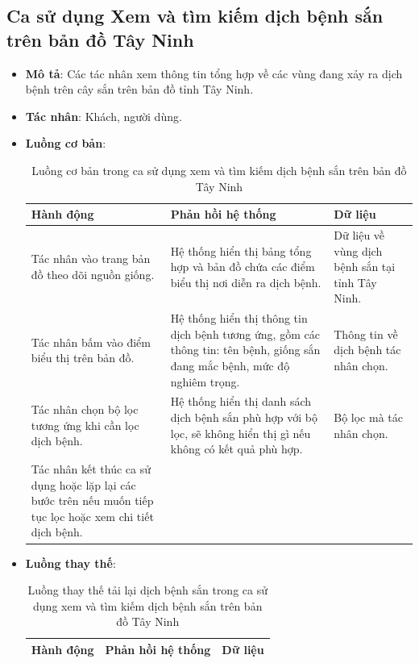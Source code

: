 \documentclass[./../main.tex]{subfiles}
\begin{document}
\subsection{Ca sử dụng Xem và tìm kiếm dịch bệnh sắn trên bản đồ Tây Ninh}
\begin{itemize}
    \item \textbf{Mô tả}: Các tác nhân xem thông tin tổng hợp về các vùng đang xảy ra dịch bệnh trên cây sắn trên bản đồ tỉnh Tây Ninh.
    \item \textbf{Tác nhân}: Khách, người dùng.
    \item \textbf{Luồng cơ bản}:
    \begin{table}[H]
    \caption{\label{uc-25}Luồng cơ bản trong ca sử dụng xem và tìm kiếm dịch bệnh sắn trên bản đồ Tây Ninh}
    \begin{tabularx}{\textwidth}{| X | X | X |}
        \hline
        \textbf{Hành động} & \textbf{Phản hồi hệ thống} & \textbf{Dữ liệu} \\ \hline
        Tác nhân vào trang bản đồ theo dõi nguồn giống. & Hệ thống hiển thị bảng tổng hợp và bản đồ chứa các điểm biểu thị nơi diễn ra dịch bệnh. & Dữ liệu về vùng dịch bệnh sắn tại tỉnh Tây Ninh.
        \\ \hline
        Tác nhân bấm vào điểm biểu thị trên bản đồ. & Hệ thống hiển thị thông tin dịch bệnh tương ứng, gồm các thông tin: tên bệnh, giống sắn đang mắc bệnh, mức độ nghiêm trọng. & Thông tin về dịch bệnh tác nhân chọn.
        \\ \hline
        Tác nhân chọn bộ lọc tương ứng khi cần lọc dịch bệnh. & Hệ thống hiển thị danh sách dịch bệnh sắn phù hợp với bộ lọc, sẽ không hiển thị gì nếu không có kết quả phù hợp. & Bộ lọc mà tác nhân chọn.
        \\ \hline
        Tác nhân kết thúc ca sử dụng hoặc lặp lại các bước trên nếu muốn tiếp tục lọc hoặc xem chi tiết dịch bệnh. & &
        \\ \hline
    \end{tabularx}
    \end{table}    
    \item \textbf{Luồng thay thế}:
        \begin{table}[H]
        \caption{\label{uc-26}Luồng thay thế tải lại dịch bệnh sắn trong ca sử dụng xem và tìm kiếm dịch bệnh sắn trên bản đồ Tây Ninh}
        \begin{tabularx}{\textwidth}{| X | X | X |}
            \hline
            \textbf{Hành động} & \textbf{Phản hồi hệ thống} & \textbf{Dữ liệu} \\ \hline

\end{tabularx}
\end{table}
\end{itemize}
\end{document}
